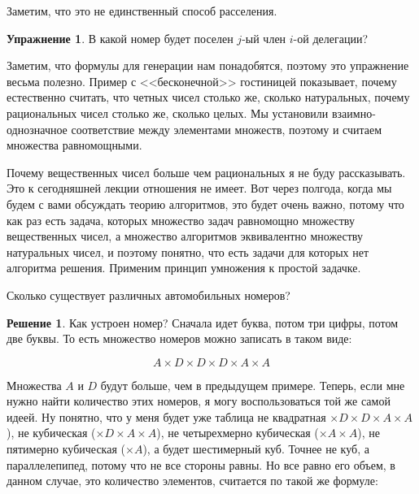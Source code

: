 \documentclass[russian]{lecture-notes}
\theoremstyle{definition}
\newtheorem*{exercise}{Упражнение}
\newtheorem*{solution}{Решение}
\begin{document}
\begin{enumerate}
		\noindent Заметим, что это не единственный способ расселения.
		
		
		\begin{exercise}
			В какой номер будет поселен $j$-ый член $i$-ой делегации?
		\end{exercise}
	
		Заметим, что формулы для генерации нам понадобятся, поэтому это упражнение весьма полезно. Пример с <<бесконечной>> гостиницей показывает, почему естественно считать, что четных чисел столько же, сколько натуральных, почему рациональных чисел столько же, сколько целых. Мы установили взаимно-однозначное соответствие между элементами множеств, поэтому и считаем множества равномощными.
		
		Почему вещественных чисел больше чем рациональных я не буду рассказывать. Это к сегодняшней лекции отношения не имеет. Вот через полгода, когда мы будем с вами обсуждать теорию алгоритмов, это будет очень важно, потому что как раз есть задача, которых множество задач равномощно множеству вещественных чисел, а множество алгоритмов эквивалентно множеству натуральных чисел, и поэтому понятно, что есть задачи для которых нет алгоритма решения. Применим принцип умножения к простой задачке. 
		
		
		\begin{problem}
			Сколько существует различных автомобильных номеров? 
		\end{problem}
	
		\begin{solution}
			Как устроен номер? Сначала идет буква, потом три цифры, потом две буквы. То есть множество номеров можно записать в таком виде:
			
			\[
				A \times D \times D \times D \times A \times A
			\]
			
			Множества $A$ и $D$ будут больше, чем в предыдущем примере. Теперь, если мне нужно найти количество этих номеров, я могу воспользоваться той же самой идеей. Ну понятно, что у меня будет уже таблица не квадратная $\times D \times D \times A \times A$), не кубическая ($\times D \times A \times A$), не четырехмерно кубическая ($\times A \times A$), не пятимерно кубическая ($\times A$), а будет шестимерный куб. Точнее не куб, а параллелепипед, потому что не все стороны равны. Но все равно его объем, в данном случае, это количество элементов, считается по такой же формуле:
			

\end{solution}
\end{enumerate}
\end{document}

